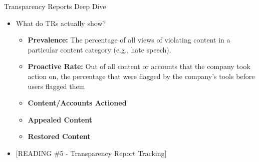 \documentclass[nobackground,dvipsnames,table]{beamer}
\begin{document}
\begin{frame}{Transparency Reports Deep Dive}

\begin{itemize}
    \item What do TRs actually show?

    \begin{itemize}
        \item \textbf{Prevalence:} The percentage of all views of violating content in a particular content category (e.g., hate speech).
        \item \textbf{Proactive Rate:} Out of all content or accounts that the company took action on, the percentage that were flagged by the company’s tools before users flagged them
        \item \textbf{Content/Accounts Actioned}
        \item \textbf{Appealed Content}
        \item \textbf{Restored Content}
    \end{itemize}

    \item {[READING \#5 - Transparency Report Tracking]}
\end{itemize}
\end{frame}
\end{document}
